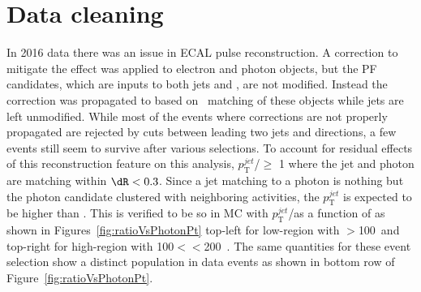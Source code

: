 \chapter{Data cleaning} %

\label{AppendixD}
\label{sec:slewratecleaning}

In 2016 data there was an issue in ECAL pulse reconstruction. A correction to mitigate the effect
was applied to electron and photon objects, but the PF 
candidates, which are inputs to both jets and \ptmiss, are not modified. Instead the correction was propagated to \ptmiss based on \dR\ 
matching of these objects while jets are left unmodified. While most of the events where corrections are not properly propagated are 
rejected by \dphi cuts between leading two jets and \ptmiss directions, a few events still seem to survive after various selections.  To 
account for residual effects of this reconstruction feature on this analysis, $p_{\text{T}}^{jet}$/\ptg $\geq$ 1 where the jet and photon 
are matching within $\dR<0.3$. Since a jet matching to a photon is nothing but the photon candidate clustered with neighboring activities, 
the $p_{\text{T}}^{jet}$ is expected to be higher than \ptg. This is verified to be so in MC with  
$p_{\text{T}}^{jet}$/\ptg as a function of \ptg as shown in Figures~\ref{fig:ratioVsPhotonPt} top-left for 
low-\dphi region with \ptmiss$>$100~\gev and top-right for high-\dphi region with 100$<$\ptmiss$<$200~\gev. The same quantities for these 
event selection show a distinct population in data events as shown in bottom row of Figure~\ref{fig:ratioVsPhotonPt}. 


